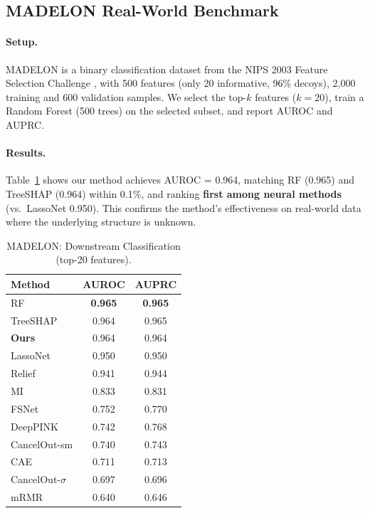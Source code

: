 \documentclass{uai2026} %
\theoremstyle{definition}
\theoremstyle{remark}
\begin{document}
\subsection{MADELON Real-World Benchmark}\label{sec:madelon}

\paragraph{Setup.}
MADELON is a binary classification dataset from the NIPS 2003 Feature Selection Challenge \citep{guyon2004result}, with 500 features (only 20 informative, 96\% decoys), 2{,}000 training and 600 validation samples.
We select the top-$k$ features ($k{=}20$), train a Random Forest (500 trees) on the selected subset, and report AUROC and AUPRC.

\paragraph{Results.}
Table~\ref{tab:madelon} shows our method achieves AUROC = 0.964, matching RF (0.965) and TreeSHAP (0.964) within 0.1\%, and ranking \textbf{first among neural methods} (vs.\ LassoNet 0.950).
This confirms the method's effectiveness on real-world data where the underlying structure is unknown.

\begin{table}[t]
    \centering
    \caption{MADELON: Downstream Classification (top-20 features).}\label{tab:madelon}
    \begin{tabular}{lcc}
        \toprule
        \textbf{Method} & \textbf{AUROC} & \textbf{AUPRC} \\
        \midrule
        RF          & \textbf{0.965} & \textbf{0.965} \\
        TreeSHAP    & 0.964 & 0.965 \\
        \textbf{Ours} & 0.964 & 0.964 \\
        LassoNet    & 0.950 & 0.950 \\
        Relief      & 0.941 & 0.944 \\
        MI          & 0.833 & 0.831 \\
        FSNet       & 0.752 & 0.770 \\
        DeepPINK    & 0.742 & 0.768 \\
        CancelOut-sm & 0.740 & 0.743 \\
        CAE         & 0.711 & 0.713 \\
        CancelOut-$\sigma$ & 0.697 & 0.696 \\
        mRMR        & 0.640 & 0.646 \\
        \bottomrule
    \end{tabular}
\end{table}
\end{document}
